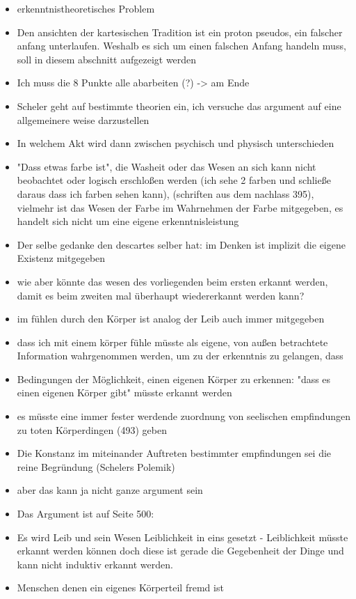 \documentclass[a4paper, 12pt]{article}
\begin{document}
\begin{onehalfspace}
\begin{itemize}
  \item erkenntnistheoretisches Problem
  \item Den ansichten der kartesischen Tradition ist ein proton pseudos, ein falscher anfang unterlaufen. Weshalb es sich um einen falschen Anfang handeln muss, soll in diesem abschnitt aufgezeigt werden
  \item Ich muss die 8 Punkte alle abarbeiten (?) -> am Ende
  \item Scheler geht auf bestimmte theorien ein, ich versuche das argument auf eine allgemeinere weise darzustellen
  \item In welchem Akt wird dann zwischen psychisch und physisch unterschieden
  \item "Dass etwas farbe ist", die Washeit oder das Wesen an sich kann nicht beobachtet oder logisch erschloßen werden (ich sehe 2 farben und schließe daraus dass ich farben sehen kann), (schriften aus dem nachlass 395), vielmehr ist das Wesen der Farbe im Wahrnehmen der Farbe mitgegeben, es handelt sich nicht um eine eigene erkenntnisleistung
  \item Der selbe gedanke den descartes selber hat: im Denken ist implizit die eigene Existenz mitgegeben
  \item wie aber könnte das wesen des vorliegenden beim ersten erkannt werden, damit es beim zweiten mal überhaupt wiedererkannt werden kann?
  \item im fühlen durch den Körper ist analog der Leib auch immer mitgegeben
  \item dass ich mit einem körper fühle müsste als eigene, von außen betrachtete Information wahrgenommen werden, um zu der erkenntnis zu gelangen, dass 
  \item Bedingungen der Möglichkeit, einen eigenen Körper zu erkennen: "dass es einen eigenen Körper gibt" müsste erkannt werden
  \item es müsste eine immer fester werdende zuordnung von seelischen empfindungen zu toten Körperdingen (493) geben
  \item Die Konstanz im miteinander Auftreten bestimmter empfindungen sei die reine Begründung (Schelers Polemik)
  \item aber das kann ja nicht ganze argument sein
  \item Das Argument ist auf Seite 500:
  \item Es wird Leib und sein Wesen Leiblichkeit in eins gesetzt - Leiblichkeit müsste erkannt werden können doch diese ist gerade die Gegebenheit der Dinge und kann nicht induktiv erkannt werden.
  \item Menschen denen ein eigenes Körperteil fremd ist
\end{itemize}


\end{onehalfspace}
\end{document}
